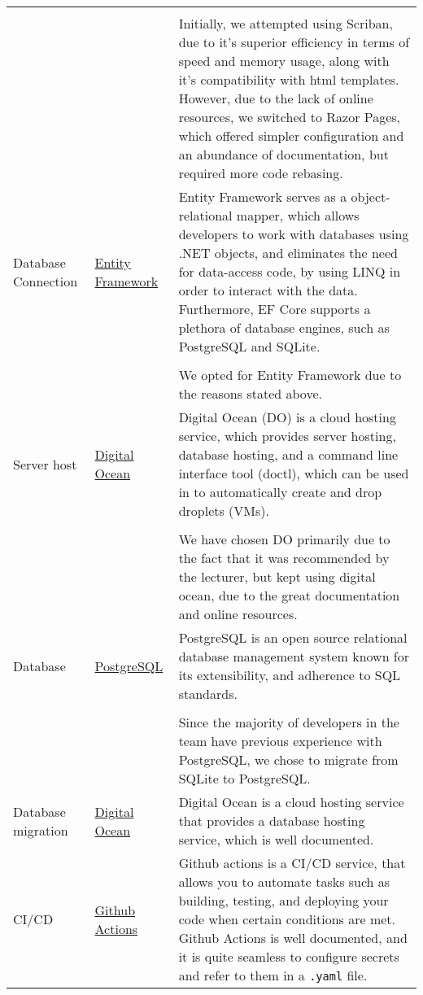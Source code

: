 \begin{longtable}{|p{}|p{} | p{}|}
    && \\
    && Initially, we attempted using Scriban, due to it's superior efficiency in terms of speed and memory usage, along with it's compatibility with html templates. However, due to the lack of online resources, we switched to Razor Pages, which offered simpler configuration and an abundance of documentation, but required more code rebasing.\\
    \hline
    Database Connection & \href{https://learn.microsoft.com/en-us/ef/core/}{Entity Framework} & Entity Framework serves as a object-relational mapper, which allows developers to work with databases using .NET objects, and eliminates the need for data-access code, by using LINQ in order to interact with the data. Furthermore, EF Core supports a plethora of database engines, such as PostgreSQL and SQLite.\\
    &&\\
    && We opted for Entity Framework due to the reasons stated above.\\
    \hline
    Server host & \href{https://docs.digitalocean.com/}{Digital Ocean} & Digital Ocean (DO) is a cloud hosting service, which provides server hosting, database hosting, and a command line interface tool (doctl), which can be used in to automatically create and drop droplets (VMs).\\
    &&\\
    && We have chosen DO primarily due to the fact that it was recommended by the lecturer, but kept using digital ocean, due to the great documentation and online resources.\\
    \hline
    Database & \href{https://www.postgresql.org/docs/}{PostgreSQL} & PostgreSQL is an open source relational database management system known for its extensibility, and adherence to SQL standards.\\
    &&\\
    && Since the majority of developers in the team have previous experience with PostgreSQL, we chose to migrate from SQLite to PostgreSQL.\\
    \hline
    Database migration & \href{https://www.digitalocean.com/products/managed-databases}{Digital Ocean} & Digital Ocean is a cloud hosting service that provides a database hosting service, which is well documented.\\ %
    \hline
    CI/CD & \href{https://docs.github.com/en/actions}{Github Actions} & Github actions is a CI/CD service, that allows you to automate tasks such as building, testing, and deploying your code when certain conditions are met. Github Actions is well documented, and it is quite seamless to configure secrets and refer to them in a \texttt{.yaml} file.\\

\end{longtable}
